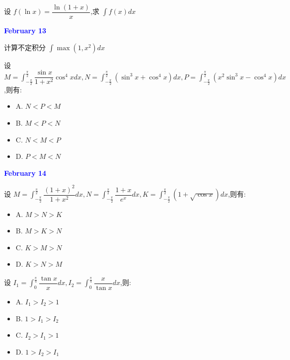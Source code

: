 \begin{example}[][Exam: 28.2.10]
	设 $f(\ln x)=\dfrac{\ln(1+x)}{x}$,求 $\int f(x)dx$
\end{example}

\textcolor{blue}{\textbf{February 13}}

\begin{example}[][Exam: 28.2.11]
	计算不定积分 $\int \max(1,x^{2})dx$
\end{example}

\begin{example}[][Exam: 28.2.12]
	设 $M=\int_{-\frac{\pi}{2}}^{\frac{\pi}{2}}\dfrac{\sin x}{1+x^{2}}\cos^{4}xdx,N=\int_{-\frac{\pi}{2}}^{\frac{\pi}{2}}(\sin^{3}x+\cos^{4}x)dx,P=\int_{-\frac{\pi}{2}}^{\frac{\pi}{2}}(x^{2}\sin^{3}x-\cos^{4}x)dx$,则有: 
\begin{itemize}
	\item A. $N<P<M$
	\item B. $M<P<N$
	\item C. $N<M<P$
	\item D. $P<M<N$
\end{itemize}
\end{example}

\textcolor{blue}{\textbf{February 14}}

\begin{example}[][Exam: 28.2.13]
	设 $M=\int_{-\frac{\pi}{2}}^{\frac{\pi}{2}}\dfrac{(1+x)^{2}}{1+x^{2}}dx,N=\int_{-\frac{\pi}{2}}^{\frac{\pi}{2}}\dfrac{1+x}{e^{x}}dx,K=\int_{-\frac{\pi}{2}}^{\frac{\pi}{2}}(1+\sqrt{\cos x})dx$,则有: 
\begin{itemize}
	\item A. $M>N>K$
	\item B. $M>K>N$
	\item C. $K>M>N$
	\item D. $K>N>M$
\end{itemize}
\end{example}

\begin{example}[][Exam: 28.2.14]
	设 $I_{1}=\int_{0}^{\frac{\pi}{4}}\dfrac{\tan x}{x}dx,I_{2}=\int_{0}^{\frac{\pi}{4}}\dfrac{x}{\tan x}dx$,则:
\begin{itemize}
	\item A. $I_{1}>I_{2}>1$
	\item B. $1>I_{1}>I_{2}$
	\item C. $I_{2}>I_{1}>1$
	\item D. $1>I_{2}>I_{1}$
\end{itemize}
\end{example}

